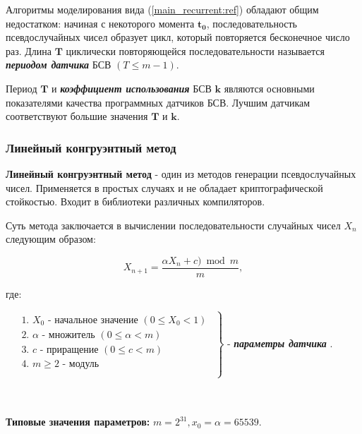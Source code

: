 Алгоритмы моделирования вида (\ref{main_recurrent:ref}) обладают общим недостатком: начиная с некоторого момента $\mathbf{t_{0}}$, последовательность псевдослучайных чисел образует цикл, который повторяется бесконечное число раз. Длина $\mathbf{T}$ циклически повторяющейся последовательности называется \textbf{\textit{периодом датчика}} БСВ $(T \leq m - 1)$.

Период $\mathbf{T}$ и \textbf{\textit{коэффициент использования}} БСВ $\mathbf{k}$ являются основными показателями качества программных датчиков БСВ. Лучшим датчикам соответствуют большие значения $\mathbf{T}$ и $\mathbf{k}$.

\subsubsection {Линейный конгруэнтный метод}\label{linear_congruential_generator}
\textbf{Линейный конгруэнтный метод} - один из методов генерации псевдослучайных чисел. Применяется в простых случаях и не обладает криптографической стойкостью. Входит в библиотеки различных компиляторов.

Суть метода заключается в вычислении последовательности случайных чисел $X_n$ следующим образом:

\begin{equation}
	X_{n+1} = \frac{\alpha X_{n} + c) \bmod m}{m},
	\label{linear_congruential_generator_formula:ref}
\end{equation}

где:

\hfill\parbox{17.5cm}{
	$
		\left.
		\begin{array}{ccc}
			\begin{aligned}
				 & \text{1. } X_{0} \text{ - начальное значение } (0 \leqslant X_{0} < 1) \\
				 & \text{2. } \alpha \text{ - множитель } (0 \leqslant \alpha < m)        \\
				 & \text{3. } c \text{ - приращение } (0 \leqslant c < m )                \\
				 & \text{4. } m \geq 2 \text{ - модуль }                                  \\
			\end{aligned}
		\end{array}
		\right\}
	$ - \textbf{\textit{параметры датчика
	}}.
}\\\\

\textbf{Типовые значения параметров:} $m = 2^{31}, x_0 = \alpha = 65539$.

